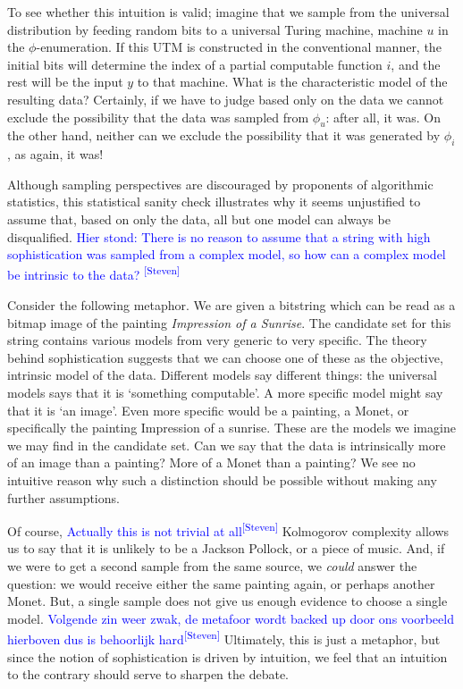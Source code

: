 \documentclass{style/llncs}
\newcommand{\sdr}[1]{\textcolor{blue}{\small #1\textsuperscript{[Steven]} }}
\begin{document}
To see whether this intuition is valid; imagine that we sample from the universal distribution by feeding random bits to a universal Turing machine, machine $u$ in the $\phi$-enumeration. If this UTM is constructed in the conventional manner, the initial bits will determine the index of a partial computable function $i$, and the rest will be the input $y$ to that machine. What is the characteristic model of the resulting data? Certainly, if we have to judge based only on the data we cannot exclude the possibility that the data was sampled from $\phi_u$: after all, it was.  On the other hand, neither can we exclude the possibility that it was generated by $\phi_i$, as again, it was! 

Although sampling perspectives are discouraged by proponents of algorithmic statistics, this statistical sanity check illustrates why it seems unjustified to assume that, based on only the data, all but one model can always be disqualified. \sdr{Hier stond: There is no reason to assume that a string with high sophistication was sampled from a complex model, so how can a complex model be intrinsic to the data? \footnotemark}


Consider the following metaphor. We are given a bitstring which can be read as a bitmap image of the painting \emph{Impression of a Sunrise}. The candidate set for this string contains various models from very generic to very specific. The theory behind sophistication suggests that we can choose one of these as the objective, intrinsic model of the data. Different models say different things: the universal models says that it is `something computable'. A more specific model might say that it is `an image'. Even more specific would be a painting, a Monet, or specifically the painting Impression of a sunrise. These are the models we imagine we may find in the candidate set. Can we say that the data is intrinsically more of an image than a painting? More of a Monet than a painting? We see no intuitive reason why such a distinction should be possible without making any further assumptions.

Of course, \sdr{Actually this is not trivial at all} Kolmogorov complexity allows us to say that it is unlikely to be a Jackson Pollock, or a piece of music. And, if we were to get a second sample from the same source, we \emph{could} answer the question: we would receive either the same painting again, or perhaps another Monet. But, a single sample does not give us enough evidence to choose a single model. \sdr{Volgende zin weer zwak, de metafoor wordt backed up door ons voorbeeld hierboven dus is behoorlijk hard} Ultimately, this is just a metaphor, but since the notion of sophistication is driven by intuition, we feel that an intuition to the contrary should serve to sharpen the debate.
\end{document}
